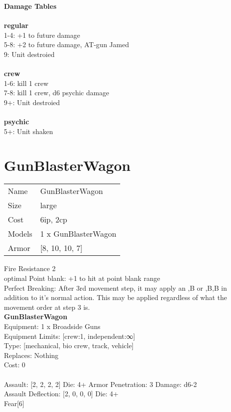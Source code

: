 {\bf Damage Tables} \\
\ \\ {\bf regular } \\
1-4: +1 to future damage \\
5-8: +2 to future damage, AT-gun Jamed \\
9: Unit destroied \\
\ \\ {\bf crew } \\
1-6: kill 1 crew \\
7-8: kill 1 crew, d6 psychic damage \\
9+: Unit destroied \\
\ \\ {\bf psychic } \\
5+: Unit shaken \\










\pagebreak\pagebreak

\section{ GunBlasterWagon }

\begin{tabular}{ll}
  Name & GunBlasterWagon \\
  Size & large\\
  Cost & 6ip, 2cp\\
  Models & 1 x GunBlasterWagon\\
  Armor & [8, 10, 10, 7]\\
\end{tabular}

\noindent Fire Resistance 2\\ 
optimal Point blank: +1 to hit at point blank range\\ 
Perfect Breaking: After 3rd movement step, it may apply an ,B or ,B,B in addition to it's normal action. This may be applied regardless of what the movement order at step 3 is.\\ 


{\bf GunBlasterWagon } \\
Equipment: 1 x Broadside Guns \\
Equipment Limits: [crew:1, independent:∞] \\
Type: [mechanical, bio crew, track, vehicle] \\
Replaces: Nothing \\
Cost: 0\\
\ \\
Assault: [2, 2, 2, 2] Die: 4+ Armor Penetration: 3 Damage: d6-2 \\
Assault Deflection: [2, 0, 0, 0] Die: 4+\\
\indent Fear[6]\\ 
 
